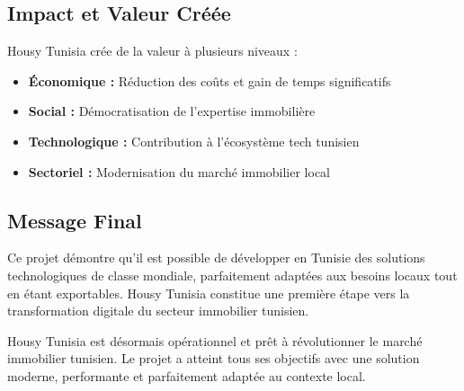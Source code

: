 \subsection{Impact et Valeur Créée}

Housy Tunisia crée de la valeur à plusieurs niveaux :

\begin{itemize}
    \item \textbf{Économique :} Réduction des coûts et gain de temps significatifs
    \item \textbf{Social :} Démocratisation de l'expertise immobilière
    \item \textbf{Technologique :} Contribution à l'écosystème tech tunisien
    \item \textbf{Sectoriel :} Modernisation du marché immobilier local
\end{itemize}

\subsection{Message Final}

Ce projet démontre qu'il est possible de développer en Tunisie des solutions technologiques de classe mondiale, parfaitement adaptées aux besoins locaux tout en étant exportables. Housy Tunisia constitue une première étape vers la transformation digitale du secteur immobilier tunisien.

\begin{resultbox}
Housy Tunisia est désormais opérationnel et prêt à révolutionner le marché immobilier tunisien. Le projet a atteint tous ses objectifs avec une solution moderne, performante et parfaitement adaptée au contexte local.
\end{resultbox}

